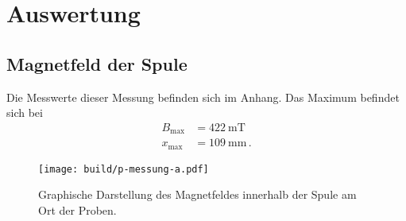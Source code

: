 \section{Auswertung}
\label{sec:Auswertung}
\subsection{Magnetfeld der Spule}
Die Messwerte dieser Messung befinden sich im Anhang.
Das Maximum befindet sich bei
\begin{align*}
  B_{\text{max}} &= \SI{422}{\milli\tesla} \\
  x_{\text{max}} &= \SI{109}{\milli\meter}\,.
\end{align*}
\begin{figure}
  \centering
  \texttt{[image: build/p-messung-a.pdf]}
  \caption{Graphische Darstellung des Magnetfeldes innerhalb der Spule am Ort der Proben.}
  \label{fig:messung-a}
\end{figure}

